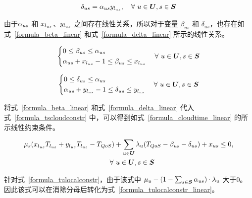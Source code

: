 \begin{equation}
  \label{formula_delta}
  \begin{gathered}
    \delta_{us} = {\alpha}_{us} y_{l_{us}},
    \quad \forall\ u \in \boldsymbol{U}, s \in \boldsymbol{S}
  \end{gathered}
\end{equation}

由于${\alpha}_{us}$ 和 $x_{l_{us}}$、$y_{l_{us}}$ 之间存在线性关系，所以对于变量 $\beta_{us}$ 和 $\delta_{us}$，也存在如式~\eqref{formula_beta_linear} 和式~\eqref{formula_delta_linear} 所示的线性关系。

\begin{equation}
  \label{formula_beta_linear}
  \left\{
  \begin{aligned}
    &0 \leq \beta_{us} \leq {\alpha}_{us} \\
    &{\alpha}_{us} + x_{l_{us}} -1 \leq \beta_{us} \leq x_{l_{us}}
  \end{aligned}
  \right.
  \quad \forall\ u \in \boldsymbol{U}, s \in \boldsymbol{S}
\end{equation}

\begin{equation}
  \label{formula_delta_linear}
  \left\{
  \begin{aligned}
    &0 \leq \delta_{us} \leq {\alpha}_{us} \\
    &{\alpha}_{us} + y_{l_{us}} -1 \leq \delta_{us} \leq y_{l_{us}}
  \end{aligned}
  \right.
  \quad \forall\ u \in \boldsymbol{U}, s \in \boldsymbol{S}
\end{equation}

将式~\eqref{formula_beta_linear} 和式~\eqref{formula_delta_linear} 代入式~\eqref{formula_tscloudconstr} 中，可以得到如式~\eqref{formula_cloudtime_linear} 的所示线性约束条件。

\begin{equation}
  \label{formula_cloudtime_linear}
  \begin{gathered}
    \mu_s (x_{l_{us}} T_{l_{us}} + y_{l_{us}} T_{l_{us}} - T_{QoS}) + \sum_{u \in \boldsymbol{U}}{\lambda}_{u}(T_{QoS} - \beta_{us} - \delta_{us}) + {x}_{us} \leq 0,\\
    \quad \forall\ u \in \boldsymbol{U}, s \in \boldsymbol{S}
  \end{gathered}
\end{equation}

针对式~\eqref{formula_tulocalconstr}，由于该式中 ${\mu}_{u} - (1 - \sum_{s \in \boldsymbol{S}}{\alpha}_{us}) \cdot {\lambda}_{u}$ 大于0。
因此该式可以在消除分母后转化为式~\eqref{formula_tulocalconstr_linear}。

